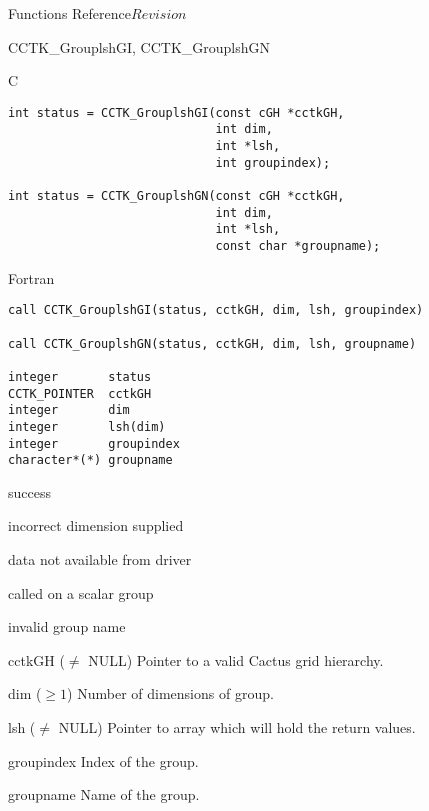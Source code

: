 \begin{cactuspart}{ Functions Reference}{}{$Revision$}
\begin{FunctionDescription}{CCTK\_GrouplshGI, CCTK\_GrouplshGN}
\begin{SynopsisSection}
\begin{Synopsis}{C}
\begin{verbatim}
int status = CCTK_GrouplshGI(const cGH *cctkGH,
                             int dim,
                             int *lsh,
                             int groupindex);

int status = CCTK_GrouplshGN(const cGH *cctkGH,
                             int dim,
                             int *lsh,
                             const char *groupname);
\end{verbatim}
\end{Synopsis}
\begin{Synopsis}{Fortran}
\begin{verbatim}
call CCTK_GrouplshGI(status, cctkGH, dim, lsh, groupindex)

call CCTK_GrouplshGN(status, cctkGH, dim, lsh, groupname)

integer       status
CCTK_POINTER  cctkGH
integer       dim
integer       lsh(dim)
integer       groupindex
character*(*) groupname
\end{verbatim}
\end{Synopsis}
\end{SynopsisSection}

\begin{ResultSection}
\begin{Result}{0} success \end{Result}
\begin{Result}{-1} incorrect dimension supplied \end{Result}
\begin{Result}{-2} data not available from driver \end{Result}
\begin{Result}{-3} called on a scalar group \end{Result}
\begin{Result}{-4} invalid group name \end{Result}
\end{ResultSection}

\begin{ParameterSection}
\begin{Parameter}{cctkGH ($\ne$ NULL)} Pointer to a valid Cactus grid hierarchy. \end{Parameter}
\begin{Parameter}{dim ($\ge 1$)} Number of dimensions of group. \end{Parameter}
\begin{Parameter}{lsh ($\ne$ NULL)} Pointer to array which will hold the return values. \end{Parameter}
\begin{Parameter}{groupindex} Index of the group. \end{Parameter}
\begin{Parameter}{groupname} Name of the group. \end{Parameter}
\end{ParameterSection}


\end{FunctionDescription}
\end{cactuspart}
